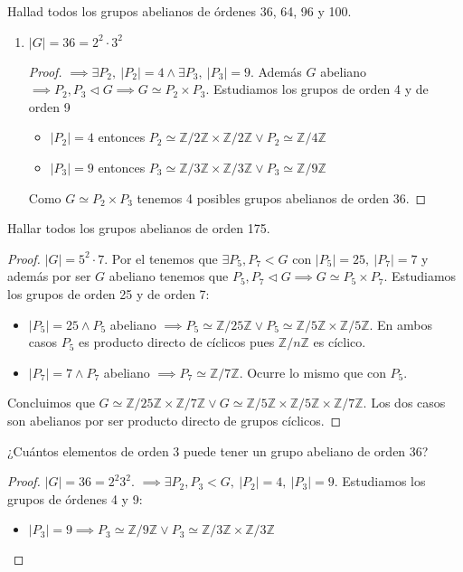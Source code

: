 \documentclass{book}
\theoremstyle{definition}
\theoremstyle{remark}
\newcommand{\normsub}{\mathbin{\triangleleft}}
\newcommand{\isom}{\simeq}
\newcommand{\Z}{\mathbb{Z}}
\begin{document}
\begin{ex}[H4.20] Hallad todos los grupos abelianos de órdenes 36, 64, 96 y 100.
	\begin{enumerate}
		\item $|G| = 36 = 2^2\cdot3^2$
		\begin{proof}
			 $\implies \exists P_2,\ |P_2| = 4 \land \exists P_3,\ |P_3| = 9$. Además $G$ abeliano $\implies P_2, P_3 \normsub G \implies G \isom P_2 \times P_3$. Estudiamos los grupos de orden 4 y de orden 9
			\begin{itemize}
				\item $|P_2| = 4$ entonces $P_2 \isom \Z/2\Z \times \Z/2\Z \lor P_2 \isom \Z/4\Z$
				\item $|P_3| = 9$ entonces $P_3 \isom \Z/3\Z \times \Z/3\Z \lor P_3 \isom \Z/9\Z$
			\end{itemize}
			Como $G \isom P_2 \times P_3$ tenemos 4 posibles grupos abelianos de orden 36.
		\end{proof}
	\end{enumerate}
\end{ex}

\begin{ex}[H4.22]
	Hallar todos los grupos abelianos de orden 175.
	
	\begin{proof}
		$|G| = 5^2\cdot 7$. Por el  tenemos que $\exists P_5, P_7 < G$ con $|P_5| = 25,\ |P_7| = 7$ y además por ser $G$ abeliano tenemos que $P_5, P_7 \normsub G \implies G \isom P_5 \times P_7$. Estudiamos los grupos de orden 25 y de orden 7:
		\begin{itemize}
			\item $|P_5| = 25 \land P_5$ abeliano $\implies P_5 \isom \Z/25\Z \lor P_5 \isom \Z/5\Z \times \Z/5\Z$. En ambos casos $P_5$ es producto directo de cíclicos pues $\Z/n\Z$ es cíclico.
			\item $|P_7| = 7 \land P_7$ abeliano $\implies P_7 \isom \Z/7\Z$. Ocurre lo mismo que con $P_5$.
		\end{itemize}
		Concluimos que $G \isom \Z/25\Z \times \Z/7\Z \lor G \isom \Z/5\Z \times \Z/5\Z \times \Z/7\Z$. Los dos casos son abelianos por ser producto directo de grupos cíclicos.
	\end{proof}
\end{ex}

\begin{ex}[H4.23]
	¿Cuántos elementos de orden 3 puede tener un grupo abeliano de orden 36?
	
	\begin{proof}
		$|G| = 36 = 2^2 3^2$.  $\implies \exists P_2, P_3 < G,\ |P_2| = 4,\ |P_3| = 9$. Estudiamos los grupos de órdenes 4 y 9:
		\begin{itemize}
			\item $|P_3| = 9 \implies P_3 \isom \Z/9\Z \lor P_3 \isom \Z/3\Z \times \Z/3\Z$
		\end{itemize}
	\end{proof}
\end{ex}
\end{document}
